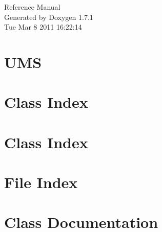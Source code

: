 \documentclass[a4paper]{book}
\begin{document}
\hypersetup{pageanchor=false}
\begin{titlepage}
\vspace*{7cm}
\begin{center}
{\Large Reference Manual}\\
\vspace*{1cm}
{\large Generated by Doxygen 1.7.1}\\
\vspace*{0.5cm}
{\small Tue Mar 8 2011 16:22:14}\\
\end{center}
\end{titlepage}
\clearemptydoublepage
{}
\tableofcontents
\clearemptydoublepage
{}
\hypersetup{pageanchor=true}
\chapter{UMS}
\label{index}\hypertarget{index}{}
\chapter{Class Index}

\chapter{Class Index}

\chapter{File Index}

\chapter{Class Documentation}


























\end{document}
